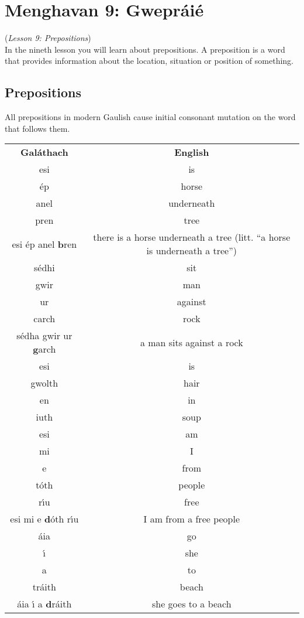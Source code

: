 \section{Menghavan 9: Gwepr\'{a}i\'{e}}
(\textit{Lesson 9: Prepositions})\\

In the nineth lesson you will learn about prepositions. A preposition is a word that provides information about the location, situation or position of something.

\subsection{Prepositions}

All prepositions in modern Gaulish cause initial consonant mutation on the word that follows them.
\begin{table}[H]
\centering
\begin{tabular}{cc}
  \toprule
  \textbf{Gal\'{a}thach} & \textbf{English}\\
  \cmidrule(lr){1-1}\cmidrule(lr){2-2}
  esi & is\\
  \'{e}p & horse\\
  anel & underneath\\
  pren & tree\\
  esi \'{e}p anel \textbf{b}ren & there is a horse underneath a tree (litt. ``a horse is underneath a tree'')\\
  \cmidrule(lr){1-1}\cmidrule(lr){2-2}
  s\'{e}dhi & sit\\
  gwir & man\\
  ur & against\\
  carch & rock\\
  s\'{e}dha gwir ur \textbf{g}arch & a man sits against a rock\\
  \cmidrule(lr){1-1}\cmidrule(lr){2-2}
  esi & is\\
  gwolth & hair\\
  en & in\\
  iuth & soup\\
  \cmidrule(lr){1-1}\cmidrule(lr){2-2}
  esi & am\\
  mi & I\\
  e & from\\
  t\'{o}th & people\\
  r\'{\i}u & free\\
  esi mi e \textbf{d}\'{o}th r\'{\i}u & I am from a free people\\
  \cmidrule(lr){1-1}\cmidrule(lr){2-2}
  \'{a}ia & go\\
  \'{\i} & she\\
  a & to\\
  tr\'{a}ith & beach\\
  \'{a}ia \'{\i} a \textbf{d}r\'{a}ith & she goes to a beach\\
  \bottomrule
\end{tabular}
\label{examples_prepositions}
\end{table}

